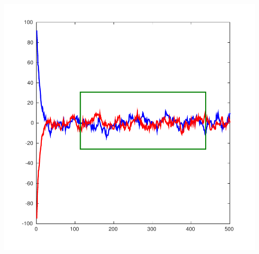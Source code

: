 \documentclass[landscape,a0]{a0poster_csml_v2}
\begin{document}
\begin{poster}
\begin{PosterColumn}
\begin{minipage}[c]{0.4\textwidth}
\includegraphics[width=\textwidth]{../img/mcmc.pdf}


\end{minipage}
\end{PosterColumn}
\end{poster}
\end{document}
